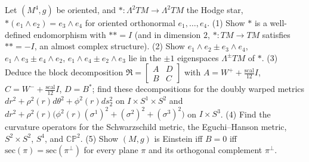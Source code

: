 \begin{remark}
  \label{rem:pet-ch4-ex-28}
  Let $(M^4,g)$ be oriented, and $*:\Lambda^2TM\to\Lambda^2TM$ the Hodge star,
  $*(e_1\wedge e_2)=e_3\wedge e_4$ for oriented orthonormal $e_1,\dots,e_4$. (1)
  Show $*$ is a well-defined endomorphism with $**=I$ (and in dimension $2$,
  $*:TM\to TM$ satisfies $**=-I$, an almost complex structure). (2) Show
  $e_1\wedge e_2\pm e_3\wedge e_4$, $e_1\wedge e_3\pm e_4\wedge e_2$,
  $e_1\wedge e_4\pm e_2\wedge e_3$ lie in the $\pm1$ eigenspaces
  $\Lambda^\pm TM$ of $*$. (3) Deduce the block decomposition
  $\mathfrak R=\left[\begin{smallmatrix}A&D\\B&C\end{smallmatrix}\right]$ with
  $A=W^++\tfrac{\mathrm{scal}}{12}I$, $C=W^-+\tfrac{\mathrm{scal}}{12}I$,
  $D=B^*$; find these decompositions for the doubly warped metrics
  $dr^2+\rho^2(r)d\theta^2+\phi^2(r)ds_2^2$ on $I\times S^1\times S^2$ and
  $dr^2+\rho^2(r)\big(\phi^2(r)(\sigma^1)^2+(\sigma^2)^2+(\sigma^3)^2\big)$ on
  $I\times S^3$. (4) Find the curvature operators for the Schwarzschild
  metric, the Eguchi--Hanson metric, $S^2\times S^2$, $S^4$, and $\mathbb{CP}^2$.
  (5) Show $(M,g)$ is Einstein iff $B=0$ iff $\mathrm{sec}(\pi)=\mathrm{sec}(\pi^\perp)$
  for every plane $\pi$ and its orthogonal complement $\pi^\perp$.
\end{remark}
